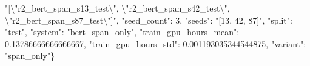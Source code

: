 "[\textbackslash{}"r2\_bert\_span\_s13\_test\textbackslash{}", \textbackslash{}"r2\_bert\_span\_s42\_test\textbackslash{}", \textbackslash{}"r2\_bert\_span\_s87\_test\textbackslash{}"]", "seed\_count": 3, "seeds": "[13, 42, 87]", "split": "test", "system": "bert\_span\_only", "train\_gpu\_hours\_mean": 0.13786666666666667, "train\_gpu\_hours\_std": 0.001193035344544875, "variant": "span\_only"\}
